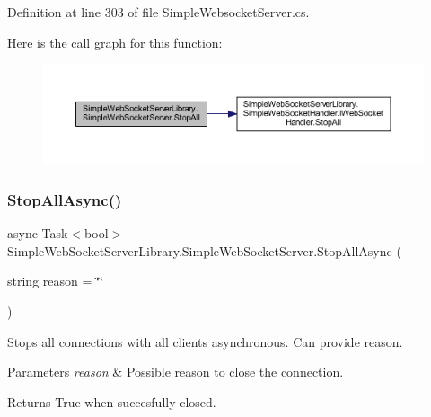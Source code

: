 Definition at line 303 of file Simple\+Websocket\+Server.\+cs.

Here is the call graph for this function\+:
\nopagebreak
\begin{figure}[H]
\begin{center}
\leavevmode
\includegraphics[width=350pt]{class_simple_web_socket_server_library_1_1_simple_web_socket_server_ad80184887910735a4caa22b903ee5fd1_cgraph}
\end{center}
\end{figure}
\mbox{\label{class_simple_web_socket_server_library_1_1_simple_web_socket_server_a1bb139b6266636ee732e584926844fdf}} 
\subsubsection{\texorpdfstring{Stop\+All\+Async()}{StopAllAsync()}}
{\footnotesize\ttfamily async Task$<$bool$>$ Simple\+Web\+Socket\+Server\+Library.\+Simple\+Web\+Socket\+Server.\+Stop\+All\+Async (\begin{DoxyParamCaption}\item[{string}]{reason = {\ttfamily \char`\"{}\char`\"{}} }\end{DoxyParamCaption})}



Stops all connections with all clients asynchronous. Can provide reason. 


\begin{DoxyParams}{Parameters}
{\em reason} & Possible reason to close the connection.\\
\hline
\end{DoxyParams}
\begin{DoxyReturn}{Returns}
True when succesfully closed.
\end{DoxyReturn}


